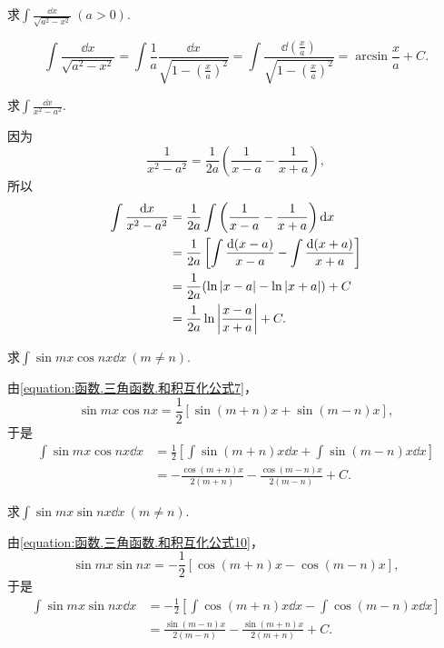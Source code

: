 \begin{example}
求\(\int \frac{\dd{x}}{\sqrt{a^2-x^2}}\ (a>0)\).
\begin{solution}
\[
	\int \frac{\dd{x}}{\sqrt{a^2-x^2}}
	= \int \frac{1}{a} \frac{\dd{x}}{\sqrt{1-\left(\frac{x}{a}\right)^2}}
	= \int \frac{\dd(\frac{x}{a})}{\sqrt{1-\left(\frac{x}{a}\right)^2}}
	= \arcsin\frac{x}{a} + C.
\]
\end{solution}
\end{example}

\begin{example}
求\(\int \frac{\dd{x}}{x^2 - a^2}\).
\begin{solution}
因为\[
	\frac{1}{x^2 - a^2}
	= \frac{1}{2a} \left(\frac{1}{x-a} - \frac{1}{x+a}\right),
\]
所以\begin{align}
	\int \frac{\dd{x}}{x^2 - a^2}
	&= \frac{1}{2a} \int \left(\frac{1}{x-a} - \frac{1}{x+a}\right) \dd{x}
		\nonumber \\
	&= \frac{1}{2a} \left[ \int \frac{\dd(x-a)}{x-a} - \int \frac{\dd(x+a)}{x+a} \right]
		\nonumber \\
	&= \frac{1}{2a} ( \ln\abs{x-a} - \ln\abs{x+a} ) + C
		\nonumber \\
	&= \frac{1}{2a} \ln\abs{\frac{x-a}{x+a}} + C.
\end{align}
\end{solution}
\end{example}

\begin{example}
求\(\int \sin mx \cos nx \dd{x}\ (m \neq n)\).
\begin{solution}
由\cref{equation:函数.三角函数.和积互化公式7}，
\[
	\sin mx \cos nx
	= \frac12 [\sin(m+n)x + \sin(m-n)x],
\]
于是\begin{align}
	\int \sin mx \cos nx \dd{x}
	&= \frac12 \left[
		\int \sin(m+n)x \dd{x}
		+ \int \sin(m-n)x \dd{x}
	\right]
	\nonumber \\
	&= -\frac{\cos(m+n)x}{2(m+n)}
		- \frac{\cos(m-n)x}{2(m-n)}
		+ C.
\end{align}
\end{solution}
\end{example}

\begin{example}
求\(\int \sin mx \sin nx \dd{x}\ (m \neq n)\).
\begin{solution}
由\cref{equation:函数.三角函数.和积互化公式10}，
\[
	\sin mx \sin nx
	= -\frac12 [\cos(m+n)x - \cos(m-n)x],
\]
于是\begin{align}
	\int \sin mx \sin nx \dd{x}
	&= -\frac12 \left[
		\int \cos(m+n)x \dd{x}
		- \int \cos(m-n)x \dd{x}
	\right]
	\nonumber \\
	&= \frac{\sin(m-n)x}{2(m-n)}
		- \frac{\sin(m+n)x}{2(m+n)}
		+ C.
\end{align}
\end{solution}
\end{example}

